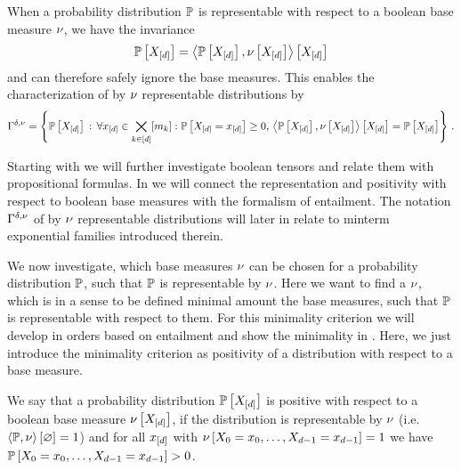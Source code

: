 When a probability distribution $\mathbb{P}$ is representable with respect to a boolean base measure $\nu$, we have the invariance
\begin{align*}
    \mathbb{P}\left[X_{[d]}\right]=\left\langle \mathbb{P}\left[X_{[d]}\right],\nu\left[X_{[d]}\right]\right\rangle \left[ X_{[d]} \right]
\end{align*}
and can therefore safely ignore the base measures.
This enables the characterization of by $\nu$ representable distributions by
\begin{align*}
    \Gamma^{\delta,\nu}
    = \left\{ \mathbb{P}\left[X_{[d]}\right] \, : \, \forall{x_{[d]}\in\bigtimes_{k\in[d]}[m_{k}]}:{\mathbb{P}\left[X_{[d]}=x_{[d]}\right]\geq0}, \, \left\langle \mathbb{P}\left[X_{[d]}\right],\nu\left[X_{[d]}\right]\right\rangle \left[ X_{[d]} \right]
    = \mathbb{P}\left[X_{[d]}\right] \right\} \, .
\end{align*}

Starting with  we will further investigate boolean tensors and relate them with propositional formulas.
In  we will connect the representation and positivity with respect to boolean base measures with the formalism of entailment.
The notation $\Gamma^{\delta,\nu}$ of by $\nu$ representable distributions will later in  relate to minterm exponential families introduced therein.

We now investigate, which base measures $\nu$ can be chosen for a probability distribution $\mathbb{P}$, such that $\mathbb{P}$ is representable by $\nu$.
Here we want to find a $\nu$, which is in a sense to be defined minimal amount the base measures, such that $\mathbb{P}$ is representable with respect to them.
For this minimality criterion we will develop in  orders based on entailment and show the minimality in .
Here, we just introduce the minimality criterion as positivity of a distribution with respect to a base measure.

\begin{definition}
    \label{def:positivityBaseMeasure}
    We say that a probability distribution $\mathbb{P}\left[X_{[d]}\right]$ is positive with respect to a boolean base measure $\nu\left[X_{[d]}\right]$, if the distribution is representable by $\nu$ (i.e. $\left\langle \mathbb{P},\nu\right\rangle \left[ \varnothing \right]=1$) and for all $x_{[d]}$ with $\nu\left[X_{0}=x_{0},\ldots,X_{d-1}=x_{d-1}\right]=1$ we have $\mathbb{P}\left[X_{0}=x_{0},\ldots,X_{d-1}=x_{d-1}\right]>0$.
\end{definition}

